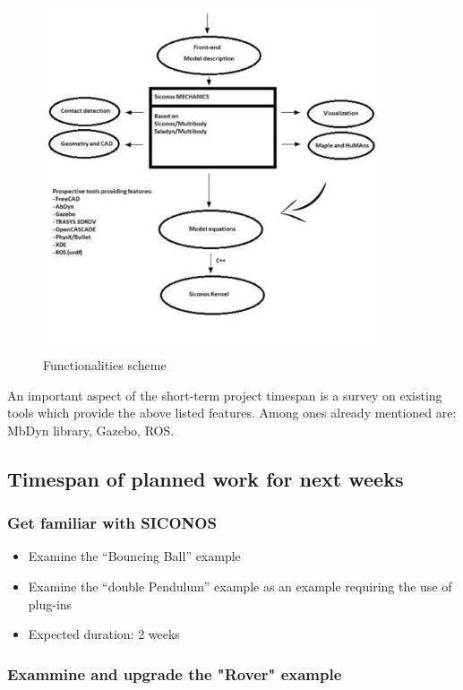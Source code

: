 \documentclass[11pt]{article}
\begin{document}
 
   \begin{figure}[htb]
\centering
\includegraphics[width=10cm]{./scheme.jpg}
\caption{\label{fig:fig1}Functionalities scheme}
\end{figure}

   An important aspect of the short-term project timespan is a survey on existing tools 
   which provide the above listed features. Among ones already mentioned are:
   MbDyn library, Gazebo, ROS.

\subsection{Timespan of planned work for next weeks}
\label{sec-1.2}


\subsubsection{Get familiar with SICONOS}
\label{sec-1.2.1}


\begin{itemize}
\item Examine the ``Bouncing Ball'' example
\item Examine the ``double Pendulum'' example as an example requiring the use of plug-ins
\item Expected duration: 2 weeks
\end{itemize}
\subsubsection{Exammine and upgrade the "Rover" example}
\label{sec-1.2.2}
\end{document}
